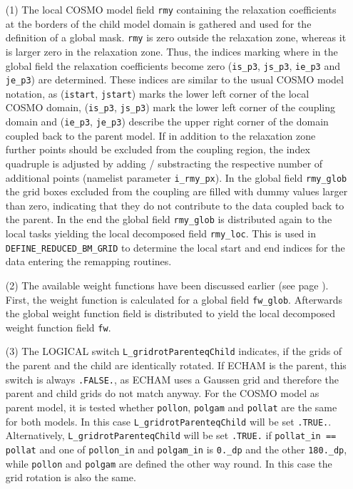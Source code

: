\documentclass[11pt,twoside]{article}
\begin{document}
\begin{enumerate}
\begin{enumerate}
\item[(1)] The local COSMO model field \verb|rmy| containing the relaxation
coefficients at the borders of the child model domain is gathered and
used for the definition of a global mask. \verb|rmy| is zero outside
the relaxation zone, whereas it is larger zero in the relaxation
zone. Thus, the indices marking where in the global field the relaxation
coefficients become zero (\verb|is_p3|, \verb|js_p3|, \verb|ie_p3|
and \verb|je_p3|) are determined. These indices are similar to the
usual  COSMO model notation, as (\verb|istart|,  \verb|jstart|) marks
the lower left corner of the local COSMO domain,
(\verb|is_p3|, \verb|js_p3|) mark the lower left corner of the
coupling domain and (\verb|ie_p3|, \verb|je_p3|) describe the upper
right corner of the domain coupled back to the parent model. 
If in addition to the relaxation zone further points should be
excluded from the coupling region, the index quadruple is adjusted by
adding / substracting the respective number of additional points
(namelist parameter \verb|i_rmy_px|). In the global field \verb|rmy_glob|
the grid boxes excluded from the coupling are filled with dummy values
larger than zero, indicating that they do not contribute to the data
coupled back to the parent. In the end the global
field \verb|rmy_glob| is distributed again to the local tasks yielding
the local decomposed field \verb|rmy_loc|. This is used in 
\verb|DEFINE_REDUCED_BM_GRID| to determine the local start and end
indices for the data entering the remapping routines.

\item[(2)] The available weight functions have been discussed earlier
(see page \pageref{descript:itype_fw}). First, the weight function is
calculated for a global field \verb|fw_glob|. Afterwards the global
weight function field is distributed to yield the local decomposed
weight function field \verb|fw|.
\item[(3)] The {\footnotesize LOGICAL} switch 
\verb|L_gridrotParenteqChild| indicates, if the grids of the parent and the
child are identically rotated. If ECHAM is the parent, this
switch is always \verb|.FALSE.|, as ECHAM uses a Gaussen grid and
therefore the parent and child grids do not match anyway. For
the COSMO model as parent 
model, it is tested whether \verb|pollon|, \verb|polgam|
and \verb|pollat| are the same for both models. In this case 
\verb|L_gridrotParenteqChild| will be set \verb|.TRUE.|.
Alternatively, \verb|L_gridrotParenteqChild| will be set \verb|.TRUE.|
if \verb|pollat_in == pollat| and one of \verb|pollon_in|
and \verb|polgam_in| is \verb|0._dp| and the 
other \verb|180._dp|, while \verb|pollon| and \verb|polgam| are
defined the other way round. In this case the grid rotation is also
the same.
\end{enumerate}



\end{enumerate}
\end{document}

